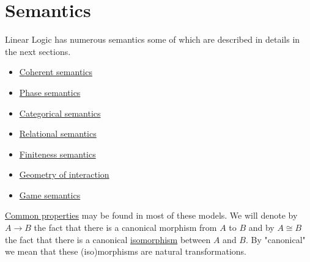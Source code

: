 \chapter{Semantics}\label{semantics}

Linear Logic has numerous semantics some of which are described in
details in the next sections.

\begin{itemize}
\item
  \hyperref[coherent-semantics]{Coherent semantics}
\item
  \hyperref[phase-semantics]{Phase semantics}
\item
  \hyperref[categorical-semantics]{Categorical semantics}
\item
  \hyperref[relational-semantics]{Relational semantics}
\item
  \hyperref[finiteness-semantics]{Finiteness semantics}
\item
  \hyperref[geometry-of-interaction]{Geometry of interaction}
\item
  \hyperref[game-semantics]{Game semantics}
\end{itemize}

\hyperref[provable-formulas]{Common properties} may be found in most of
these models. We will denote by \(A\longrightarrow B\) the fact that
there is a canonical morphism from \(A\) to \(B\) and by \(A\cong B\)
the fact that there is a canonical \hyperref[isomorphism]{isomorphism} between \(A\) and
\(B\). By "canonical" we mean that these (iso)morphisms are natural
transformations.


